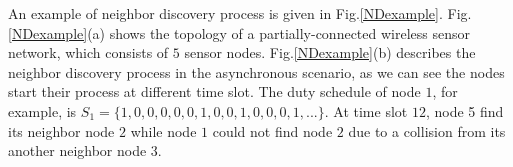 An example of neighbor discovery process is given in Fig.\ref{NDexample}. 
Fig.\ref{NDexample}(a) shows the topology of a partially-connected 
wireless sensor network, which consists of $5$ sensor nodes. 
Fig.\ref{NDexample}(b) describes the neighbor discovery process 
in the asynchronous scenario, as we can see the nodes 
start their process at different time slot. The duty schedule of 
node $1$, for example, is $S_1 = \{ 1, 0, 0, 0, 0, 0, 1, 0, 0, 1, 0, 0, 0, 1, ... \}$.  
At time slot $12$, node 5 find its neighbor node $2$ while node $1$ 
could not find node $2$ due to a collision from its another neighbor node $3$. 



